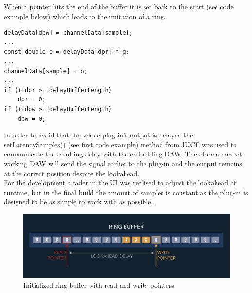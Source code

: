 When a pointer hits the end of the buffer it is set back to the start (see code example below) which leads to the imitation of a ring.\\

\begin{lstlisting}[frame=single]
delayData[dpw] = channelData[sample];
...
const double o = delayData[dpr] * g;
...
channelData[sample] = o;
...
if (++dpr >= delayBufferLength)
	dpr = 0;
if (++dpw >= delayBufferLength)
	dpw = 0;
\end{lstlisting}

In order to avoid that the whole plug-in's output is delayed the setLatencySamples() (see first code example) method from JUCE was used to communicate the resulting delay with the embedding DAW. Therefore a correct working DAW will send the signal earlier to the plug-in and the output remains at the correct position despite the lookahead.\\
For the development a fader in the UI was realised to adjust the lookahead at runtime, but in the final build the amount of samples is constant as the plug-in is designed to be as simple to work with as possible.\\

\begin{figure}[H]
\includegraphics[width=\textwidth]{images/ring_buffer}
\caption{Initialized ring buffer with read and write pointers}
\label{RBuf}
\end{figure}

